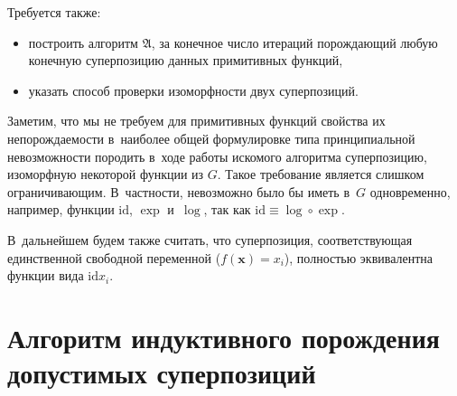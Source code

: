 \documentclass[12pt,a4paper]{amsart}
\begin{document}
Требуется также:
\begin{itemize}
  \item построить алгоритм $\mathfrak{A}$, за конечное число итераций
	порождающий любую конечную суперпозицию данных примитивных функций,
  \item указать способ проверки изоморфности двух суперпозиций.
\end{itemize}

Заметим, что мы не требуем для примитивных функций свойства их
непорождаемости в~наиболее общей формулировке типа принципиальной
невозможности породить в~ходе работы искомого алгоритма суперпозицию,
изоморфную некоторой функции из $G$. Такое требование является слишком
ограничивающим. В~частности, невозможно было бы иметь в~$G$ одновременно,
например, функции $\text{id}$, $\exp$ и~$\log$, так как
$\text{id} \equiv \log \circ \exp$.

В~дальнейшем будем также считать, что суперпозиция, соответствующая
единственной свободной переменной ($f(\mathbf{x}) = x_i$), полностью
эквивалентна функции вида $\text{id} x_i$.

\section{Алгоритм индуктивного порождения допустимых суперпозиций}
\end{document}
